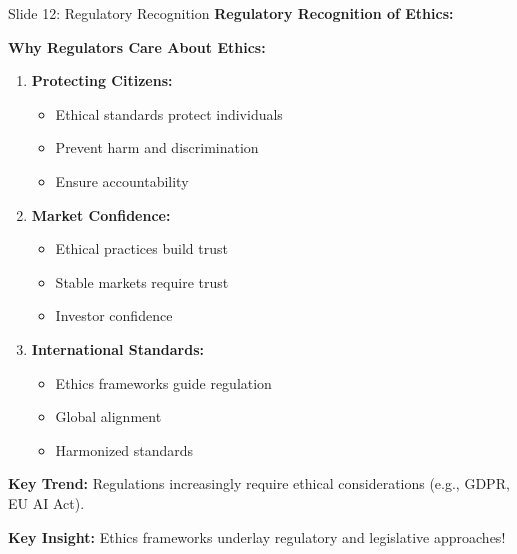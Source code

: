 \documentclass[8pt]{beamer}
\begin{document}
	\begin{frame}{Slide 12: Regulatory Recognition}
		\fontsize{6.5}{7.5}\selectfont
		\textbf{Regulatory Recognition of Ethics:}
		
		\vspace{0.1cm}
		\textbf{Why Regulators Care About Ethics:}
		\begin{enumerate}
			\item \textbf{Protecting Citizens:}
			\begin{itemize}
				\item Ethical standards protect individuals
				\item Prevent harm and discrimination
				\item Ensure accountability
			\end{itemize}
			\item \textbf{Market Confidence:}
			\begin{itemize}
				\item Ethical practices build trust
				\item Stable markets require trust
				\item Investor confidence
			\end{itemize}
			\item \textbf{International Standards:}
			\begin{itemize}
				\item Ethics frameworks guide regulation
				\item Global alignment
				\item Harmonized standards
			\end{itemize}
		\end{enumerate}
		
		\vspace{0.1cm}
		\textbf{Key Trend:}
		Regulations increasingly require ethical considerations (e.g., GDPR, EU AI Act).
		
		\textcolor{myblue}{\textbf{Key Insight:}} Ethics frameworks underlay \textcolor{myblue}{regulatory and legislative approaches}!
	\end{frame}
	
\end{document}
